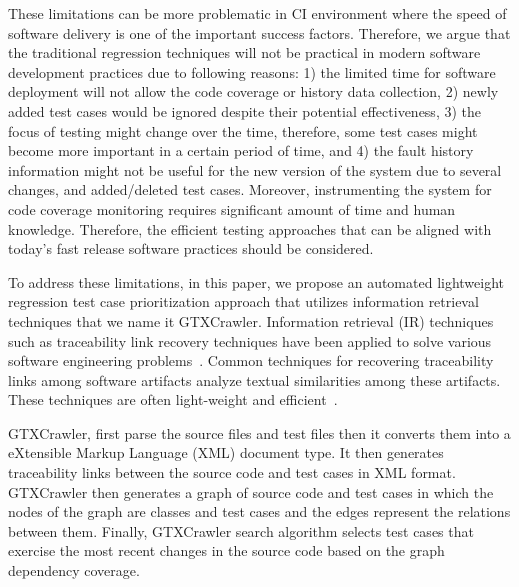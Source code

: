 These limitations can be more problematic in 
CI environment where the speed of software delivery is 
one of the important success factors. Therefore, we 
argue that the traditional regression techniques 
will not be practical in modern software development practices
due to following reasons: 1) the limited time for software deployment 
will not allow the code coverage or history data collection, 
2) newly added test cases would be ignored despite their 
potential effectiveness, 3) the focus of testing might change 
over the time, therefore, some test cases might become 
more important in a certain period of time, and 4) the 
fault history information might not be useful for the new 
version of the system due to several changes, and added/deleted test cases. 
Moreover, instrumenting the system for code coverage monitoring 
requires significant amount of time and human knowledge. 
Therefore, the efficient testing 
approaches that can be aligned with today's fast
release software practices should be considered.



To address these limitations, in this paper, we propose an
automated lightweight regression test case prioritization 
approach that utilizes information retrieval techniques
that we name it GTXCrawler. 
Information retrieval (IR) techniques such as traceability 
link recovery techniques have been applied to solve
various software engineering problems~\cite{spanoudakis04}.
Common techniques for recovering traceability links
among software artifacts analyze
textual similarities among these artifacts. 
These techniques are often light-weight and efficient~\cite{Retest}. 




GTXCrawler, first parse the source files and test files then 
it converts them into a eXtensible Markup
Language (XML) document type. It then  
generates traceability links between the source code and test cases
in XML format. GTXCrawler then generates a graph 
of source code and test cases in which the nodes of the graph 
are classes and test cases and the edges 
represent the relations between them. 
Finally, GTXCrawler search algorithm selects test cases that exercise the most
recent changes in the source code based on the graph dependency coverage. 



